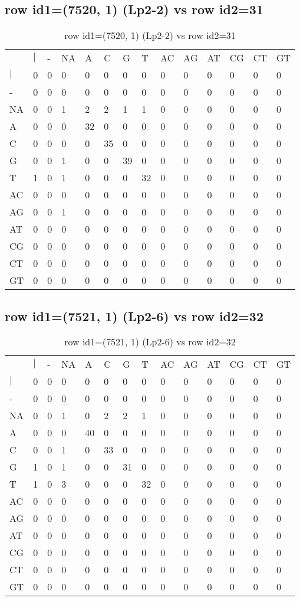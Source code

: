 \subsection{row id1=(7520, 1) (Lp2-2) vs row id2=31}
\begin{center}
\begin{longtable}{|l|l|l|l|l|l|l|l|l|l|l|l|l|l|}
\caption{row id1=(7520, 1) (Lp2-2) vs row id2=31} \label{table_dm328}\\
\hline
\\
\hline
&$|$&-&NA&A&C&G&T&AC&AG&AT&CG&CT&GT\\
$|$&0&0&0&0&0&0&0&0&0&0&0&0&0\\
-&0&0&0&0&0&0&0&0&0&0&0&0&0\\
NA&0&0&1&2&2&1&1&0&0&0&0&0&0\\
A&0&0&0&32&0&0&0&0&0&0&0&0&0\\
C&0&0&0&0&35&0&0&0&0&0&0&0&0\\
G&0&0&1&0&0&39&0&0&0&0&0&0&0\\
T&1&0&1&0&0&0&32&0&0&0&0&0&0\\
AC&0&0&0&0&0&0&0&0&0&0&0&0&0\\
AG&0&0&1&0&0&0&0&0&0&0&0&0&0\\
AT&0&0&0&0&0&0&0&0&0&0&0&0&0\\
CG&0&0&0&0&0&0&0&0&0&0&0&0&0\\
CT&0&0&0&0&0&0&0&0&0&0&0&0&0\\
GT&0&0&0&0&0&0&0&0&0&0&0&0&0\\
\hline
\end{longtable}
\end{center}

\subsection{row id1=(7521, 1) (Lp2-6) vs row id2=32}
\begin{center}
\begin{longtable}{|l|l|l|l|l|l|l|l|l|l|l|l|l|l|}
\caption{row id1=(7521, 1) (Lp2-6) vs row id2=32} \label{table_dm330}\\
\hline
\\
\hline
&$|$&-&NA&A&C&G&T&AC&AG&AT&CG&CT&GT\\
$|$&0&0&0&0&0&0&0&0&0&0&0&0&0\\
-&0&0&0&0&0&0&0&0&0&0&0&0&0\\
NA&0&0&1&0&2&2&1&0&0&0&0&0&0\\
A&0&0&0&40&0&0&0&0&0&0&0&0&0\\
C&0&0&1&0&33&0&0&0&0&0&0&0&0\\
G&1&0&1&0&0&31&0&0&0&0&0&0&0\\
T&1&0&3&0&0&0&32&0&0&0&0&0&0\\
AC&0&0&0&0&0&0&0&0&0&0&0&0&0\\
AG&0&0&0&0&0&0&0&0&0&0&0&0&0\\
AT&0&0&0&0&0&0&0&0&0&0&0&0&0\\
CG&0&0&0&0&0&0&0&0&0&0&0&0&0\\
CT&0&0&0&0&0&0&0&0&0&0&0&0&0\\
GT&0&0&0&0&0&0&0&0&0&0&0&0&0\\
\hline
\end{longtable}
\end{center}

